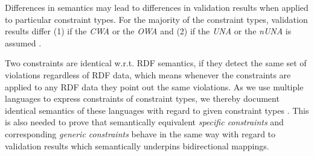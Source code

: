 \documentclass[a4paper,fontsize=11pt]{scrartcl}
\begin{document}





Differences in semantics may lead to differences in validation results when applied to particular constraint types.
For the majority of the constraint types, validation results differ (1) if the \emph{CWA} or the \emph{OWA} and (2) if the \emph{UNA} or the \emph{nUNA} is assumed \cite{BoschNolleAcarEckert2015}.

Two constraints are identical w.r.t. RDF semantics, 
if they detect the same set of violations regardless of RDF data, 
which means whenever the constraints are applied to any RDF data they point out the same violations.
As we use multiple languages to express constraints of constraint types, 
we thereby document identical semantics of these languages with regard to given constraint types \cite{BoschNolleAcarEckert2015}.
This is also needed to prove that semantically equivalent \emph{specific constraints} and corresponding \emph{generic constraints}
behave in the same way with regard to validation results which semantically underpins bidirectional mappings.
\end{document}
